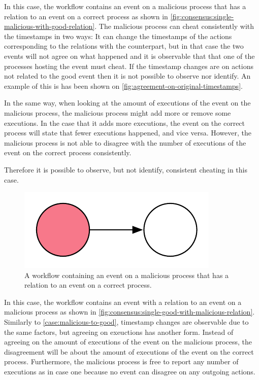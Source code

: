 	\begin{case}
		In this case, the workflow contains an event on a malicious process that has a relation to an event on a correct process as shown in \autoref{fig:consensus:single-malicious-with-good-relation}. The malicious process can cheat consistently with the timestamps in two ways: It can change the timestamps of the actions corresponding to the relations with the counterpart, but in that case the two events will not agree on what happened and it is observable that that one of the processes hosting the event must cheat. If the timestamp changes are on actions not related to the good event then it is not possible to observe nor identify. An example of this is has been shown on \autoref{fig:agreement-on-original-timestamps}.
		
		In the same way, when looking at the amount of executions of the event on the malicious process, the malicious process might add more or remove some executions. In the case that it adds more executions, the event on the correct process will state that fewer executions happened, and vice versa. However, the malicious process is not able to disagree with the number of executions of the event on the correct process consistently. 
		
		Therefore it is possible to observe, but not identify, consistent cheating in this case. 
		\label{case:malicious-to-good}
	\end{case}

	\begin{figure}[H]
		\centering
		\includegraphics{6validation/images/3.pdf}
		\caption{A workflow containing an event on a malicious process that has a relation to an event on a correct process.}
		\label{fig:consensus:single-malicious-with-good-relation}
	\end{figure}
	
	\begin{case}
		In this case, the workflow contains an event with a relation to an event on a malicious process as shown in \autoref{fig:consensus:single-good-with-malicious-relation}. Similarly to \autoref{case:malicious-to-good}, timestamp changes are observable due to the same factors, but agreeing on exeuctions has another form. Instead of agreeing on the amount of executions of the event on the malicious process, the disagreement will be about the amount of executions of the event on the correct process. Furthermore, the malicious process is free to report any number of executions as in case one because no event can disagree on any outgoing actions. 
		\label{case:good-to-malicious}
	\end{case}
	 
